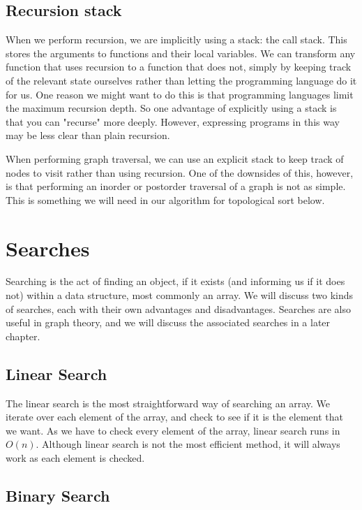 \subsection{Recursion stack}
When we perform recursion, we are implicitly using a stack: the call stack. This stores the arguments to functions and their local variables. We can transform any function that uses recursion to a function that does not, simply by keeping track of the relevant state ourselves rather than letting the programming language do it for us. One reason we might want to do this is that programming languages limit the maximum recursion depth. So one advantage of explicitly using a stack is that you can "recurse" more deeply. However, expressing programs in this way may be less clear than plain recursion.

When performing graph traversal, we can use an explicit stack to keep track of nodes to visit rather than using recursion. One of the downsides of this, however, is that performing an inorder or postorder traversal of a graph is not as simple. This is something we will need in our algorithm for topological sort below.

\section{Searches}

Searching is the act of finding an object, if it exists (and informing us if it does not) within a data structure, most commonly an array.  We will discuss two kinds of searches, each with their own advantages and disadvantages.  Searches are also useful in graph theory, and we will discuss the associated searches in a later chapter.

\subsection{Linear Search}

The linear search is the most straightforward way of searching an array.  We iterate over each element of the array, and check to see if it is the element that we want.  As we have to check every element of the array, linear search runs in $ O(n) $.  Although linear search is not the most efficient method, it will always work as each element is checked.

\subsection{Binary Search}

